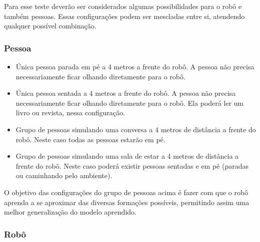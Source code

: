 Para esse teste deverão ser considerados algumas possibilidades para o robô e também pessoas. Essas configurações podem ser mescladas entre si, atendendo qualquer possível combinação.

\subsubsection{Pessoa}

\begin{itemize}
	\item Única pessoa parada em pé a 4 metros a frente do robô. A pessoa não precisa necessariamente ficar olhando diretamente para o robô.
	\item Única pessoa sentada a 4 metros a frente do robô. A pessoa não precisa necessariamente ficar olhando diretamente para o robô. Ela poderá ler um livro ou revista, nessa configuração.
	\item Grupo de pessoas simulando uma conversa a 4 metros de distância a frente do robô. Neste caso todas as pessoas estarão em pé.
	\item Grupo de pessoas simulando uma sala de estar a 4 metros de distância a frente do robô. Neste caso poderá existir pessoas sentadas e em pé (paradas ou caminhando pelo ambiente).
\end{itemize}

O objetivo das configurações do grupo de pessoas acima é fazer com que o robô aprenda a se aproximar das diversas formações possíveis, permitindo assim uma melhor generalização do modelo aprendido.

\subsubsection{Robô}

